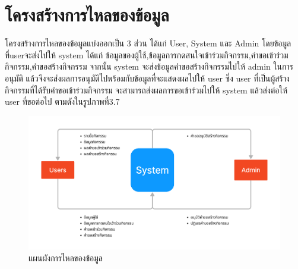 \FloatBarrier

\section{โครงสร้างการไหลของข้อมูล}
โครงสร้างการไหลของข้อมูลแบ่งออกเป็น 3 ส่วน ได้แก่ User, System และ Admin
โดยข้อมูลที่userจะส่งไปให้ system ได้แก่ ข้อมูลของผู้ใช้,ข้อมูลการกดสนใจเข้าร่วมกิจกรรม,คำขอเข้าร่วมกิจกรรม,คำขอสร้างกิจกรรม
จากนั้น system จะส่งข้อมูลคำขอสร้างกิจกรรมไปให้ admin ในการอนุมัติ แล้วจึงจะส่งผลการอนุมัติไปพร้อมกับข้อมูลที่จะแสดงผลไปให้ user
ซึ่ง user ที่เป็นผู้สร้างกิจกรรมที่ได้รับคำขอเข้าร่วมกิจกรรม จะสามารถส่งผลการขอเข้าร่วมไปให้ system แล้วส่งต่อให้ user ที่ขอต่อไป ตามดังในรูปภาพที่3.7
\begin{figure}[h]
\begin{center}
\includegraphics[width=0.9\linewidth]{image/dataflow-diagram.png}
\end{center}
\caption[Poem]{แผนผังการไหลของข้อมูล}
\label{fig:dataflow}
\end{figure}


